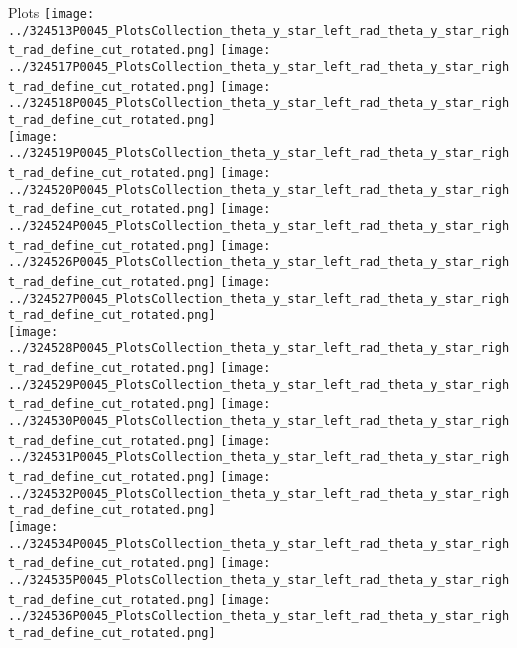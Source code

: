 \documentclass{beamer}
\begin{document}
\begin{frame}
\begin{block}{Plots}
                \texttt{[image: ../324513P0045\_PlotsCollection\_theta\_y\_star\_left\_rad\_theta\_y\_star\_right\_rad\_define\_cut\_rotated.png]}
                \texttt{[image: ../324517P0045\_PlotsCollection\_theta\_y\_star\_left\_rad\_theta\_y\_star\_right\_rad\_define\_cut\_rotated.png]}
                \texttt{[image: ../324518P0045\_PlotsCollection\_theta\_y\_star\_left\_rad\_theta\_y\_star\_right\_rad\_define\_cut\_rotated.png]}\\
                \texttt{[image: ../324519P0045\_PlotsCollection\_theta\_y\_star\_left\_rad\_theta\_y\_star\_right\_rad\_define\_cut\_rotated.png]}
                \texttt{[image: ../324520P0045\_PlotsCollection\_theta\_y\_star\_left\_rad\_theta\_y\_star\_right\_rad\_define\_cut\_rotated.png]}
                \texttt{[image: ../324524P0045\_PlotsCollection\_theta\_y\_star\_left\_rad\_theta\_y\_star\_right\_rad\_define\_cut\_rotated.png]}
                \texttt{[image: ../324526P0045\_PlotsCollection\_theta\_y\_star\_left\_rad\_theta\_y\_star\_right\_rad\_define\_cut\_rotated.png]}
                \texttt{[image: ../324527P0045\_PlotsCollection\_theta\_y\_star\_left\_rad\_theta\_y\_star\_right\_rad\_define\_cut\_rotated.png]}\\
                \texttt{[image: ../324528P0045\_PlotsCollection\_theta\_y\_star\_left\_rad\_theta\_y\_star\_right\_rad\_define\_cut\_rotated.png]}
                \texttt{[image: ../324529P0045\_PlotsCollection\_theta\_y\_star\_left\_rad\_theta\_y\_star\_right\_rad\_define\_cut\_rotated.png]}
                \texttt{[image: ../324530P0045\_PlotsCollection\_theta\_y\_star\_left\_rad\_theta\_y\_star\_right\_rad\_define\_cut\_rotated.png]}
                \texttt{[image: ../324531P0045\_PlotsCollection\_theta\_y\_star\_left\_rad\_theta\_y\_star\_right\_rad\_define\_cut\_rotated.png]}
                \texttt{[image: ../324532P0045\_PlotsCollection\_theta\_y\_star\_left\_rad\_theta\_y\_star\_right\_rad\_define\_cut\_rotated.png]}\\
                \texttt{[image: ../324534P0045\_PlotsCollection\_theta\_y\_star\_left\_rad\_theta\_y\_star\_right\_rad\_define\_cut\_rotated.png]}
                \texttt{[image: ../324535P0045\_PlotsCollection\_theta\_y\_star\_left\_rad\_theta\_y\_star\_right\_rad\_define\_cut\_rotated.png]}
                \texttt{[image: ../324536P0045\_PlotsCollection\_theta\_y\_star\_left\_rad\_theta\_y\_star\_right\_rad\_define\_cut\_rotated.png]}

        \end{block}
\end{frame}
\end{document}
